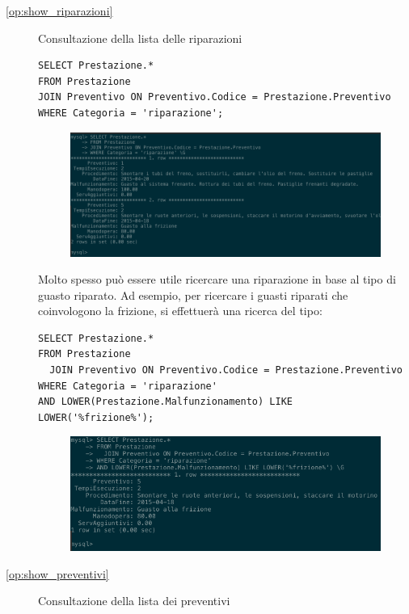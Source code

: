 \begin{description}
            \item[\ref{op:show_riparazioni}] Consultazione della lista delle riparazioni

              \begin{lstlisting}
SELECT Prestazione.*
FROM Prestazione
JOIN Preventivo ON Preventivo.Codice = Prestazione.Preventivo
WHERE Categoria = 'riparazione';
              \end{lstlisting}

              \begin{figure}[H]
                \centering
                \includegraphics[width=12cm]{images/screenshots/list_riparazioni.png}
              \end{figure}

              Molto spesso può essere utile ricercare una riparazione in base al tipo di guasto riparato. Ad esempio, per ricercare i guasti riparati che coinvologono la frizione, si effettuerà una ricerca del tipo:

              \begin{lstlisting}
SELECT Prestazione.*
FROM Prestazione
  JOIN Preventivo ON Preventivo.Codice = Prestazione.Preventivo
WHERE Categoria = 'riparazione'
AND LOWER(Prestazione.Malfunzionamento) LIKE LOWER('%frizione%');
              \end{lstlisting}

              \begin{figure}[H]
                \centering
                \includegraphics[width=12cm]{images/screenshots/search_riparazioni.png}
              \end{figure}

            \item[\ref{op:show_preventivi}] Consultazione della lista dei preventivi

              \begin{lstlisting}
                
              \end{lstlisting}

          \end{description}
